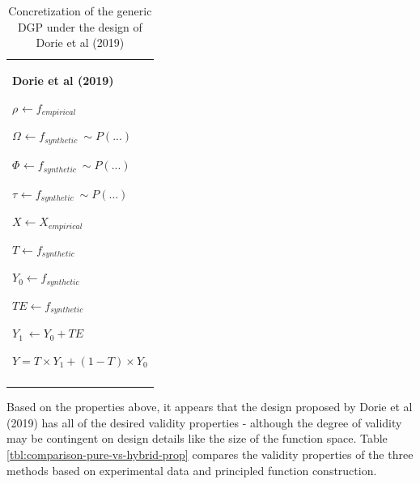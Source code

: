 \documentclass[../main.tex]{subfiles}
\begin{document}
\begin{table}[H]
 			\centering
\begin{tabular}{p{3.14in}}
\hline
\multicolumn{1}{|p{3.14in}|}{\textbf{Dorie et al (2019)} \par  \(  \rho _{} \leftarrow f_{empirical}~ \)  \par  \(  \Omega _{} \leftarrow f_{synthetic}~\sim P \left( ... \right)  _{} \)  \par  \(  \Phi _{} \leftarrow f_{synthetic}~\sim P \left( ... \right)  _{} \)  \par  \(  \tau_{} \leftarrow f_{synthetic}~ \sim P \left( ... \right) \)  \par  \( X \leftarrow X_{empirical} \)  \par  \( T \leftarrow f_{synthetic} \)  \par  \( Y_{0} \leftarrow f_{synthetic} \)  \par  \( TE \leftarrow f_{synthetic} \)  \par  \( Y_{1}~ \leftarrow Y_{0}+ TE \)  \par  \( Y = T \times Y_{1}+  \left( 1-T \right)  \times Y_{0} \)  \par } \\
\hhline{-}

\end{tabular}
\caption{Concretization of the generic DGP under the design of Dorie et al (2019)}
\label{tbl:dorie-hybrid}
 \end{table}




\vspace{\baselineskip}
Based on the properties above, it appears that the design proposed by Dorie et al (2019) has all of the desired validity properties - although the degree of validity may be contingent on design details like the size of the function space. Table \ref{tbl:comparison-pure-vs-hybrid-prop} compares the validity properties of the three methods based on experimental data and principled function construction.


\vspace{\baselineskip}


\end{document}
